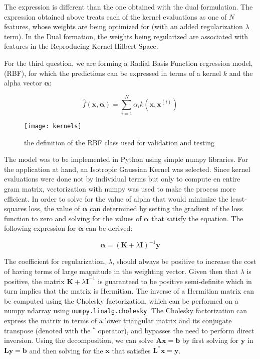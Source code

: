 The expression is different than the one obtained with the dual formulation. The expression obtained above treats each of the kernel evaluations as one of $N$ features, whose weights are being optimized for (with an added regularization $\lambda$ term). In the Dual formation, the weights being regularized are associated with features in the Reproducing Kernel Hilbert Space.

\iftrue
{}
For the third question, we are forming a Radial Basis Function regression model, (RBF), for which the predictions can be expressed in terms of a kernel $k$ and the alpha vector $\boldsymbol\alpha$:

\begin{equation}
\hat{f}(\mathbf{x}, \boldsymbol\alpha) = \sum_{i=1}^{N} \alpha_i k(\mathbf{x}, \mathbf{x}^{(i)})
\end{equation}


\begin{figure}[H]
\centering
\texttt{[image: kernels]}
\caption{the definition of the RBF class used for validation and testing}
\end{figure}

The model was to be implemented in Python using simple numpy libraries. For the application at hand, an Isotropic Gaussian Kernel was selected. Since kernel evaluations were done not by individual terms but only to compute en entire gram matrix, vectorization with numpy was used to make the process more efficient. In order to solve for the value of alpha that would minimize the least-squares loss, the value of $\boldsymbol\alpha$ can determined by setting the gradient of the loss function to zero and solving for the values of $\boldsymbol\alpha$ that satisfy the equation. The following expression for $\boldsymbol\alpha$ can be derived:

\begin{equation}
\boldsymbol\alpha = (\mathbf{K} + \lambda \mathbf{I})^{-1} \mathbf{y}
\end{equation}

The coefficient for regularization, $\lambda$, should always be positive to increase the cost of having terms of large magnitude in the weighting vector. Given then that $\lambda$ is positive, the matrix $\mathbf{K} + \lambda \mathbf{I}^{-1}$ is guaranteed to be positive semi-definite which in turn implies that the matrix is Hermitian. The inverse of a Hermitian matrix can be computed using the Cholesky factorization, which can be performed on a numpy ndarray using \verb+numpy.linalg.cholesky+. The Cholesky factorization can express the matrix in terms of a lower triangular matrix and its conjugate transpose (denoted with the $^*$ operator), and bypasses the need to perform direct inversion. Using the decomposition, we can solve $\mathbf{Ax} = \mathbf{b}$ by first solving for $\mathbf{y}$ in $\mathbf{Ly} = \mathbf{b}$ and then solving for the $\mathbf{x}$ that satisfies $\mathbf{L^{*}x} = \mathbf{y}$.

